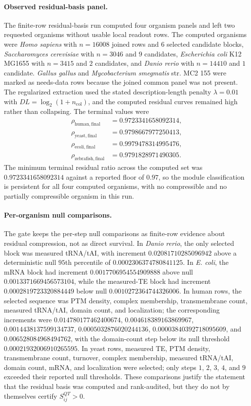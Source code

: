 \paragraph{Observed residual-basis panel.}
The finite-row residual-basis run computed four organism panels and left two requested organisms without usable local readout rows.  The computed organisms were \emph{Homo sapiens} with $n=16008$ joined rows and $6$ selected candidate blocks, \emph{Saccharomyces cerevisiae} with $n=3046$ and $9$ candidates, \emph{Escherichia coli} K12 MG1655 with $n=3415$ and $2$ candidates, and \emph{Danio rerio} with $n=14410$ and $1$ candidate.  \emph{Gallus gallus} and \emph{Mycobacterium smegmatis} str. MC2 155 were marked as needs-data rows because the joined common panel was not present.  The regularized extraction used the stated description-length penalty $\lambda=0.01$ with $DL=\log_2(1+n_{\mathrm{col}})$, and the computed residual curves remained high rather than collapsing.  The terminal values were
$$
\begin{aligned}
\rho_{\mathrm{human,final}} &= 0.9723341658092314,\\
\rho_{\mathrm{yeast,final}} &= 0.9798667977250413,\\
\rho_{\mathrm{ecoli,final}} &= 0.9979478314995476,\\
\rho_{\mathrm{zebrafish,final}} &= 0.9791828971490305.
\end{aligned}
$$
The minimum terminal residual ratio across the computed set was $0.9723341658092314$ against a reported floor of $0.97$, so the module classification is persistent for all four computed organisms, with no compressible and no partially compressible organism in this run.

\paragraph{Per-organism null comparisons.}
The gate keeps the per-step null comparisons as finite-row evidence about residual compression, not as direct survival.  In \emph{Danio rerio}, the only selected block was measured tRNA/tAI, with increment $0.02081710285096942$ above a deterministic null $95$th percentile of $0.0002306374780841125$.  In \emph{E. coli}, the mRNA block had increment $0.0017706954554909888$ above null $0.0013371669456573104$, while the measured-TE block had increment $0.0002819723320884449$ below null $0.0010272364744326006$.  In human rows, the selected sequence was PTM density, complex membership, transmembrane count, measured tRNA/tAI, domain count, and localization; the corresponding increments were $0.014780177462400674$, $0.004618389163869967$, $0.0014438137599134737$, $0.0005032876020244136$, $0.00003840392718095609$, and $0.006528084968494762$, with the domain-count step below its null threshold $0.00021932006910265595$.  In yeast rows, measured TE, PTM density, transmembrane count, turnover, complex membership, measured tRNA/tAI, domain count, mRNA, and localization were selected; only steps $1$, $2$, $3$, $4$, and $9$ exceeded their reported null thresholds.  These comparisons justify the statement that the residual basis was computed and rank-audited, but they do not by themselves certify $S^{QT}_{ij}>0$.

